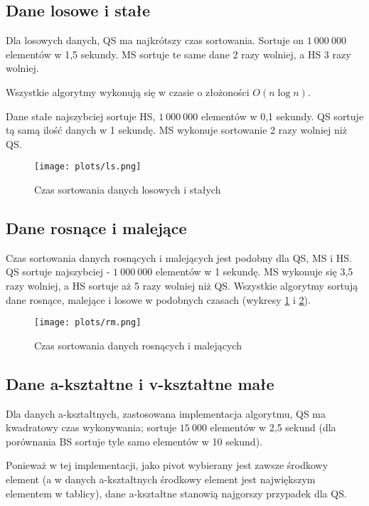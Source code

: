 \documentclass[11pt,twocolumn]{article}
\begin{document}
\subsection{Dane losowe i stałe}

Dla losowych danych, QS ma najkrótszy czas sortowania. Sortuje on $1\ 000\ 000$ elementów w 1,5 sekundy. MS sortuje te same dane 2 razy wolniej, a HS 3 razy wolniej. 

Wszystkie algorytmy wykonują się w czasie o złożoności $O(n \log n)$.

Dane stałe najszybciej sortuje HS, $1\ 000\ 000$ elementów w 0,1 sekundy. QS sortuje tą samą ilość danych w 1 sekundę. MS wykonuje sortowanie 2 razy wolniej niż QS.
\begin{figure}[h]
	\texttt{[image: plots/ls.png]}
	\caption{Czas sortowania danych losowych i stałych \label{losowe_stale_duze}}
\end{figure}



\subsection{Dane rosnące i malejące}

Czas sortowania danych rosnących i malejących jest podobny dla QS, MS i HS. QS sortuje najszybciej - $1\ 000\ 000$ elementów w 1 sekundę. MS wykonuje się 3,5 razy wolniej, a HS sortuje aż 5 razy wolniej niż QS. Wszystkie algorytmy sortują dane rosnące, malejące i losowe w podobnych czasach (wykresy \ref{losowe_stale_duze} i \ref{rosnace_malejace_duze}).

\begin{figure}[h!]
	\texttt{[image: plots/rm.png]}
	\caption{Czas sortowania danych rosnących i malejących \label{rosnace_malejace_duze}}
\end{figure}



\subsection{Dane a-kształtne i v-kształtne małe}

Dla danych a-kształtnych, zastosowana implementacja algorytmu, QS ma kwadratowy czas wykonywania; sortuje $15\ 000$ elementów w 2,5 sekund (dla porównania BS sortuje tyle samo elementów w 10 sekund). 

Ponieważ w tej implementacji, jako pivot wybierany jest zawsze środkowy element (a w danych a-kształtnych środkowy element jest największym elementem w tablicy), dane a-kształtne stanowią najgorszy przypadek dla QS.
\end{document}
